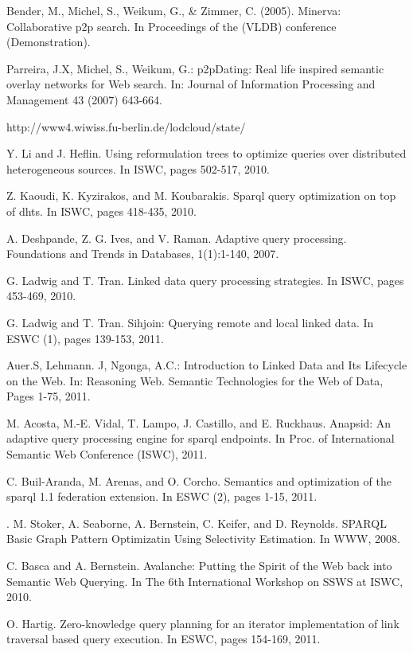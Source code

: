 \documentclass{sig-alternate}  %
\begin{document}
\begin{thebibliography}{10}
Bender, M., Michel, S., Weikum, G., \& Zimmer, C.
(2005). Minerva: Collaborative p2p search. In Proceedings of the (VLDB)
conference (Demonstration).

Parreira, J.X, Michel, S., Weikum, G.: p2pDating:
Real life inspired semantic overlay networks for Web search. In: Journal
of Information Processing and Management 43 (2007) 643-664.

 http://www4.wiwiss.fu-berlin.de/lodcloud/state/

Y. Li and J. Hefl{}in. Using reformulation trees
to optimize queries over distributed heterogeneous sources. In ISWC,
pages 502-517, 2010.

Z. Kaoudi, K. Kyzirakos, and M. Koubarakis. Sparql
query optimization on top of dhts. In ISWC, pages 418-435, 2010.

A. Deshpande, Z. G. Ives, and V. Raman. Adaptive
query processing. Foundations and Trends in Databases, 1(1):1-140,
2007.

 G. Ladwig and T. Tran. Linked data query processing
strategies. In ISWC, pages 453-469, 2010.

G. Ladwig and T. Tran. Sihjoin: Querying remote and
local linked data. In ESWC (1), pages 139-153, 2011.

Auer.S, Lehmann. J, Ngonga, A.C.: Introduction to
Linked Data and Its Lifecycle on the Web. In: Reasoning Web. Semantic
Technologies for the Web of Data, Pages 1-75, 2011.

M. Acosta, M.-E. Vidal, T. Lampo, J. Castillo, and
E. Ruckhaus. Anapsid: An adaptive query processing engine for sparql
endpoints. In Proc. of International Semantic Web Conference (ISWC),
2011.

C. Buil-Aranda, M. Arenas, and O. Corcho. Semantics
and optimization of the sparql 1.1 federation extension. In ESWC (2),
pages 1-15, 2011.

. M. Stoker, A. Seaborne, A. Bernstein, C. Keifer,
and D. Reynolds. SPARQL Basic Graph Pattern Optimizatin Using Selectivity
Estimation. In WWW, 2008.

C. Basca and A. Bernstein. Avalanche: Putting the
Spirit of the Web back into Semantic Web Querying. In The 6th International
Workshop on SSWS at ISWC, 2010.

O. Hartig. Zero-knowledge query planning for an iterator
implementation of link traversal based query execution. In ESWC, pages
154-169, 2011.


\end{thebibliography}
\end{document}
